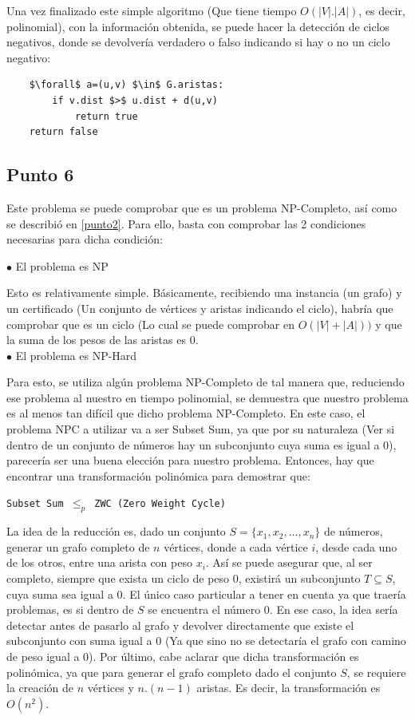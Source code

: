 \documentclass[a4paper,10pt]{article}
\begin{document}
	Una vez finalizado este simple algoritmo (Que tiene tiempo $O(|V|.|A|)$, es decir, polinomial), con la información obtenida, se puede hacer la detección de ciclos negativos, donde se devolvería verdadero o falso indicando si hay o no un ciclo negativo:
	\begin{lstlisting}
	$\forall$ a=(u,v) $\in$ G.aristas:
	    if v.dist $>$ u.dist + d(u,v)
	        return true
	return false
	\end{lstlisting}

\subsection{Punto 6}
	Este problema se puede comprobar que es un problema NP-Completo, así como se describió en \ref{punto2}. Para ello, basta con comprobar las 2 condiciones necesarias para dicha condición:

	$\bullet$ El problema es NP

	Esto es relativamente simple. Básicamente, recibiendo una instancia (un grafo) y un certificado (Un conjunto de vértices y aristas indicando el ciclo), habría que comprobar que es un ciclo (Lo cual se puede comprobar en $O(|V|+|A|))$ y que la suma de los pesos de las aristas es 0. \\

	$\bullet$ El problema es NP-Hard

	Para esto, se utiliza algún problema NP-Completo de tal manera que, reduciendo ese problema al nuestro en tiempo polinomial, se demuestra que nuestro problema es al menos tan difícil que dicho problema NP-Completo. En este caso, el problema NPC a utilizar va a ser Subset Sum, ya que por su naturaleza (Ver si dentro de un conjunto de números hay un subconjunto cuya suma es igual a 0), parecería ser una buena elección para nuestro problema. Entonces, hay que encontrar una transformación polinómica para demostrar que:

	\texttt{Subset Sum $\leq_p$ ZWC (Zero Weight Cycle)}
	\linebreak

	La idea de la reducción es, dado un conjunto $S = \{x_1, x_2, ..., x_n\}$ de números, generar un grafo completo de $n$ vértices, donde a cada vértice $i$, desde cada uno de los otros, entre una arista con peso $x_i$. Así se puede asegurar que, al ser completo, siempre que exista un ciclo de peso 0, existirá un subconjunto $T \subseteq S$, cuya suma sea igual a 0. El único caso particular a tener en cuenta ya que traería problemas, es si dentro de $S$ se encuentra el número 0. En ese caso, la idea sería detectar antes de pasarlo al grafo y devolver directamente que existe el subconjunto con suma igual a 0 (Ya que sino no se detectaría el grafo con camino de peso igual a 0). Por último, cabe aclarar que dicha transformación es polinómica, ya que para generar el grafo completo dado el conjunto $S$, se requiere la creación de $n$ vértices y $n.(n-1)$ aristas. Es decir, la transformación es $O(n^2)$.
\end{document}
